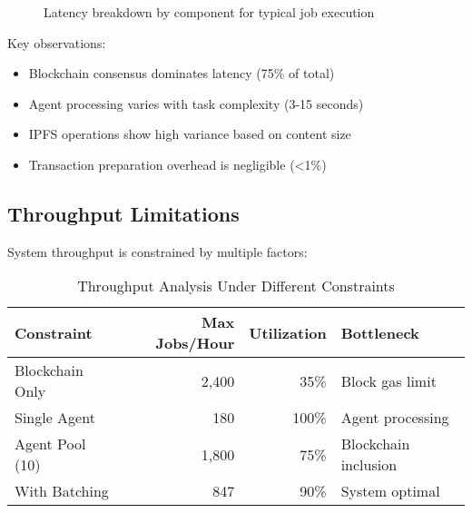 \begin{figure}[h]
\centering
{}
\caption{Latency breakdown by component for typical job execution}
\label{fig:latency-breakdown}
\end{figure}

Key observations:
\begin{itemize}
    \item Blockchain consensus dominates latency (75\% of total)
    \item Agent processing varies with task complexity (3-15 seconds)
    \item IPFS operations show high variance based on content size
    \item Transaction preparation overhead is negligible (<1\%)
\end{itemize}

\subsection{Throughput Limitations}

System throughput is constrained by multiple factors:

\begin{table}[h]
\centering
\caption{Throughput Analysis Under Different Constraints}
\label{tab:throughput}
\begin{tabular}{lrrl}
\toprule
\textbf{Constraint} & \textbf{Max Jobs/Hour} & \textbf{Utilization} & \textbf{Bottleneck} \\
\midrule
Blockchain Only & 2,400 & 35\% & Block gas limit \\
Single Agent & 180 & 100\% & Agent processing \\
Agent Pool (10) & 1,800 & 75\% & Blockchain inclusion \\
With Batching & 847 & 90\% & System optimal \\
\bottomrule
\end{tabular}
\end{table}

